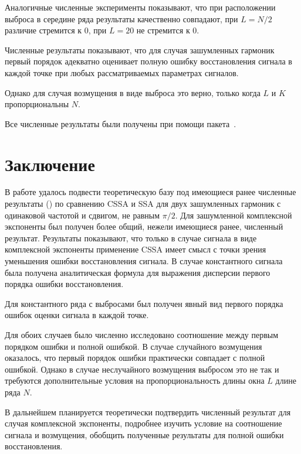 \documentclass[12pt,a4paper]{article}
\begin{document}
Аналогичные численные эксперименты показывают, что при расположении выброса в середине ряда результаты качественно совпадают, при $L = N/2$ различие стремится к $0$, при $L = 20$ не стремится к $0$.

Численные результаты показывают, что для случая зашумленных гармоник первый порядок адекватно оценивает полную ошибку восстановления сигнала в каждой точке при любых рассматриваемых параметрах сигналов.

Однако для случая возмущения в виде выброса это верно, только когда $L$ и $K$ пропорциональны $N$.

Все численные результаты были получены при помощи пакета~\cite{Korobeynikov.etal2014}.


\section{Заключение}
\label{sec:conclusions}

В работе удалось подвести теоретическую базу под имеющиеся ранее численные результаты (\cite{Golyandina.etal2013}) по сравнению CSSA и SSA для двух зашумленных гармоник с одинаковой частотой и сдвигом, не равным $\pi/2$. Для зашумленной комплексной экспоненты был получен более общий, нежели имеющиеся ранее, численный результат.
Результаты показывают, что только в случае сигнала в виде комплексной экспоненты применение CSSA имеет смысл с точки зрения уменьшения ошибки восстановления сигнала. В случае константного сигнала была получена аналитическая формула для выражения дисперсии первого порядка ошибки восстановления.

Для константного ряда с выбросами был получен явный вид первого порядка ошибок оценки сигнала в каждой точке.

Для обоих случаев было численно исследовано соотношение между первым порядком ошибки и полной ошибкой.
В случае случайного возмущения оказалось, что первый порядок ошибки практически совпадает с полной ошибкой. Однако в случае неслучайного возмущения выбросом это не так и требуются дополнительные условия на пропорциональность длины окна $L$ длине ряда $N$.

В дальнейшем планируется теоретически подтвердить численный результат для случая комплексной экспоненты, подробнее изучить условие на соотношение сигнала и возмущения, обобщить полученные результаты для полной ошибки восстановления.





\end{document}
